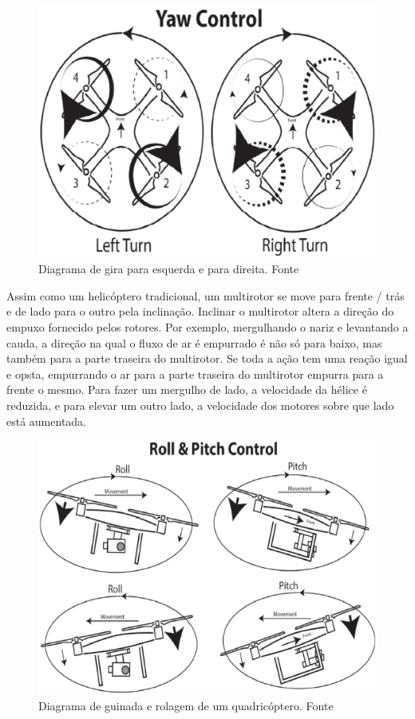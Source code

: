 \begin{figure}[H]
    \centering
      \includegraphics[keepaspectratio=true,scale=0.5]{figuras/gira.eps}
    \caption{Diagrama de gira para esquerda e para direita. Fonte \cite{audronis}}
    \label{fig:gira}
\end{figure}

Assim como um helicóptero tradicional, um multirotor se move para frente / trás e de lado para o outro pela inclinação. Inclinar o multirotor altera a direção do empuxo fornecido pelos rotores. Por exemplo, mergulhando o nariz e levantando a cauda, a direção na qual o fluxo de ar é empurrado é não só para baixo, mas também para a parte traseira do multirotor. Se toda a ação tem uma reação igual e opsta, empurrando o ar para a parte traseira do multirotor empurra para a frente o mesmo. Para fazer um mergulho de lado, a velocidade da hélice é reduzida, e para elevar um outro lado, a velocidade dos motores sobre que lado está aumentada.


\begin{figure}[H]
    \centering
      \includegraphics[keepaspectratio=true,scale=0.5]{figuras/guinada.eps}
    \caption{Diagrama de guinada e rolagem de um quadricóptero. Fonte \cite{audronis}}
    \label{fig:guinada}
\end{figure}

